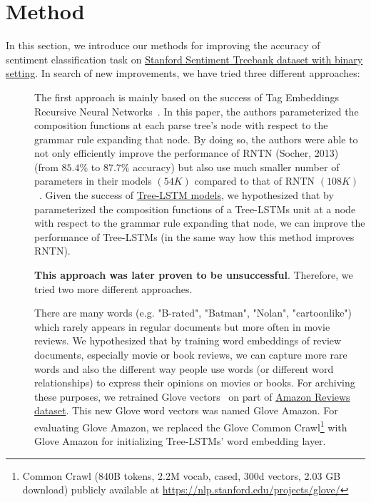 \hypertarget{chap:method}{\chapter{Method}}\label{method}
In this section, we introduce our methods for improving the accuracy of sentiment classification task on \hyperref[sec:sst]{Stanford Sentiment Treebank dataset with binary setting}.
In search of new improvements, we have tried three different approaches:
\begin{description}
\item[] The first approach is mainly based on the success of Tag Embeddings Recursive Neural Networks~\cite{tag-embedding-rnn}.
In this paper, the authors parameterized the composition functions at each parse tree's node with respect to the grammar rule expanding that node.
By doing so, the authors were able to not only efficiently improve the performance of RNTN (Socher, 2013)~\cite{socher2013recursive} (from \(85.4\%\) to \(87.7\%\) accuracy) but also use much smaller number of parameters in their models \((54K)\) compared to that of RNTN \((108K)\)~\cite{tag-embedding-rnn}.
Given the success of \hyperref[sec:treelstm]{Tree-LSTM models}, we hypothesized that by parameterized the composition functions of a Tree-LSTMs unit at a node with respect to the grammar rule expanding that node, we can improve the performance of Tree-LSTMs (in the same way how this method improves RNTN).

\textbf{This approach was later proven to be unsuccessful}. Therefore, we tried two more different approaches.

\item[] \label{movie-hypothesis} There are many words (e.g. "B-rated", "Batman", "Nolan", "cartoonlike") which rarely appears in regular documents but more often in movie reviews.
We hypothesized that by training word embeddings of review documents, especially movie or book reviews, we can capture more rare words and also the different way people use words (or different word relationships) to express their opinions on movies or books.
For archiving these purposes, we retrained Glove vectors~\cite{glove} on part of  \hyperref[sec:amazon]{Amazon Reviews dataset}.
This new Glove word vectors was named Glove Amazon.
For evaluating Glove Amazon, we replaced the Glove Common Crawl\footnote{Common Crawl (840B tokens, 2.2M vocab, cased, 300d vectors, 2.03 GB download) publicly available at \url{https://nlp.stanford.edu/projects/glove/}} with Glove Amazon for initializing Tree-LSTMs' word embedding layer.


\end{description}
